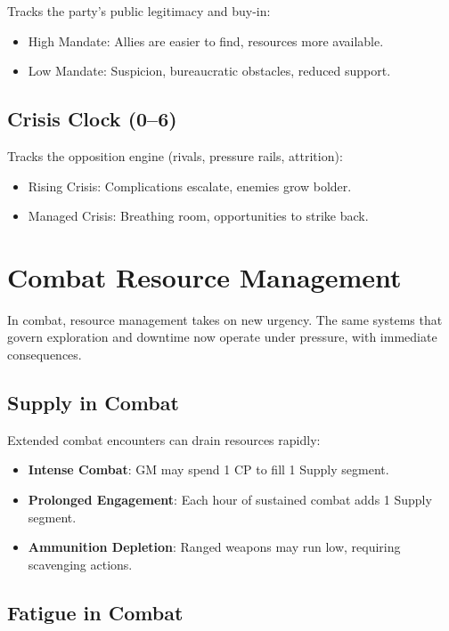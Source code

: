 Tracks the party's public legitimacy and buy-in:
\begin{itemize}
    \item High Mandate: Allies are easier to find, resources more available.
    \item Low Mandate: Suspicion, bureaucratic obstacles, reduced support.
\end{itemize}

\subsection*{Crisis Clock (0--6)}

Tracks the opposition engine (rivals, pressure rails, attrition):
\begin{itemize}
    \item Rising Crisis: Complications escalate, enemies grow bolder.
    \item Managed Crisis: Breathing room, opportunities to strike back.
\end{itemize}

\section*{Combat Resource Management}

In combat, resource management takes on new urgency. The same systems that govern exploration and downtime now operate under pressure, with immediate consequences.

\subsection*{Supply in Combat}

Extended combat encounters can drain resources rapidly:

\begin{itemize}
    \item \textbf{Intense Combat}: GM may spend 1 CP to fill 1 Supply segment.
    \item \textbf{Prolonged Engagement}: Each hour of sustained combat adds 1 Supply segment.
    \item \textbf{Ammunition Depletion}: Ranged weapons may run low, requiring scavenging actions.
\end{itemize}

\subsection*{Fatigue in Combat}

